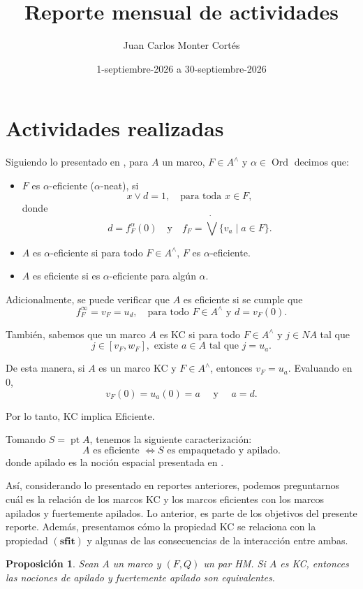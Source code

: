 \documentclass[12pt]{article}
\title{Reporte mensual de actividades}
\date{1-septiembre-2026 a 30-septiembre-2026}
\author{Juan Carlos Monter Cortés}
\newtheorem{prop}[thm]{Proposición}
\DeclareMathOperator{\Ord}{Ord}
\DeclareMathOperator{\pt}{pt}
\begin{document}
\maketitle

\section{Actividades realizadas}

Siguiendo lo presentado en \cite{sexton2003point}, para $A$ un marco, $F\in A^\wedge$ y $\alpha\in \Ord$ decimos que:
\begin{itemize}
    \item $F$ es $\alpha$-eficiente ($\alpha$-neat), si
    \[
    x\vee d=1,\quad \text{para toda }x\in F,
    \]
    donde 
    \[
    d=f_F^\alpha(0)\quad\text{y}\quad f_F=\dot{\bigvee}\{v_a\mid a\in F\}.
    \]
    \item $A$ es $\alpha$-eficiente si para todo $F\in A^\wedge$, $F$ es $\alpha$-eficiente.
    \item $A$ es eficiente si es $\alpha$-eficiente para algún $\alpha$.
\end{itemize}

Adicionalmente, se puede verificar que $A$ es eficiente si se cumple que
\[
f_F^\infty=v_F=u_d, \quad\text{para todo }F\in A^\wedge \text{ y }d=v_F(0).
\]

También, sabemos que un marco $A$ es KC si para todo $F\in A^\wedge$ y $j\in NA$ tal que 
\[
j\in [v_F, w_F], \text{ existe } a\in A\text{ tal que } j=u_a.
\]

De esta manera, si $A$ es un marco KC y $F\in A^\wedge$, entonces $v_F=u_a$. Evaluando en 0, 
\[
v_F(0)=u_a(0)=a\quad\text{ y }\quad a=d.
\]

Por lo tanto, KC implica Eficiente.

Tomando $S=\pt A$, tenemos la siguiente caracterización:
\[
A \text{ es eficiente }\iff S \text{ es empaquetado y apilado}.
\]
donde apilado es la noción espacial presentada en \cite{sexton2006ordinal}.

Así, considerando lo presentado en reportes anteriores, podemos preguntarnos cuál es la relación de los marcos KC y los marcos eficientes con los marcos 
apilados y fuertemente apilados. Lo anterior, es parte de los objetivos del presente reporte. Además, presentamos cómo la propiedad KC se relaciona con 
la propiedad $\mathbf{(sfit)}$ y algunas de las consecuencias de la interacción entre ambas.

\begin{prop}\label{KCSS}
    Sean $A$ un marco y $(F,Q)$ un par HM. Si $A$ es KC, entonces las nociones de apilado y fuertemente apilado son equivalentes.
\end{prop}
\end{document}
